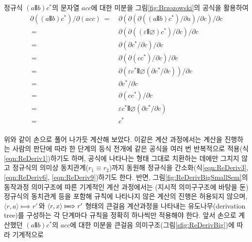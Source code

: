 정규식 $(a\VERT b)c^{*}$의 문자열 $acc$에 대한 미분을
그림\;\ref{fig:Brzozowski}의 공식을 활용하여 \vspace*{-2ex}
{\addtolength{\jot}{-1ex}
\begin{align}
     \partial((a\VERT b)c^{*})/\partial(acc)
~=~& \partial(\partial(\partial((a\VERT b)c^{*})
            / \partial a)/\partial c)/\partial c     \label{eqn:ReDeriv1}\\
~=~& \partial(\partial((\varepsilon\VERT\varnothing)c^{*})
            / \partial c)/\partial c                 \label{eqn:ReDeriv2}\\
~=~& \partial(\partial c^{*}/\partial c)/\partial c  \label{eqn:ReDeriv3}\\
~=~& \partial(\partial(cc^{*})/\partial c)/\partial c \label{eqn:ReDeriv4}\\
~=~& \partial(\varepsilon c^{*}\VERT\varnothing(\partial c^{*}/\partial c))
     /\partial c                                     \label{eqn:Rederiv5}\\
~=~& \partial c^{*}/\partial c                       \label{eqn:ReDeriv6}\\
~=~& \partial(cc^{*})/\partial c                     \label{eqn:ReDeriv7}\\
~=~& \varepsilon c^{*}\VERT\varnothing(\partial c^{*}/\partial c)
                                                     \label{eqn:ReDeriv8}\\
~=~& c^{*}                                           \label{eqn:ReDeriv9}
\end{align}
\vspace*{-5ex}\\
}
위와 같이 손으로 풀어 나가듯 계산해 보았다. 이같은 계산 과정에서는
계산을 진행하는 사람의 판단에 따라 한 단계의 등식 전개에 같은 공식을
여러 번 반복적으로 적용(식\;\ref{eqn:ReDeriv1})하기도 하며,
공식에 나타나는 형태 그대로 치환하는 데에만 그치지 않고 정규식의 의미상
동치관계($r_1\equiv r_2$)까지 동원해 정규식을 간소화(식\;\ref{eqn:ReDeriv3},
\ref{eqn:ReDeriv6}, \ref{eqn:ReDeriv9})하기도 한다.
반면, 그림\;\ref{fig:ReDerivBigSmallSem}의
동작과정 의미구조에 따른 기계적인 계산 과정에서는 (지시적 의미구구조에
바탕을 둔) 정규식의 동치관계 등을 포함해 규칙에 나타나지 않은 계산의
진행은 허용되지 않으며, $\langle r,a\rangle\Longmapsto r'$\,와
$\langle r,x\rangle\LONGmapsto r'$ 형태의 큰걸음
계산과정을 나타내는 유도나무(derivation tree)를 구성하는 각 단계마다
규칙을 정확히 하나씩만 적용해야 한다. 앞서 손으로 계산했던
$(a\VERT b)c^{*}$의 $acc$에 대한 미분을
큰걸음 의미구조(그림\;\ref{sfig:ReDerivBig})에 따라 기계적으로

